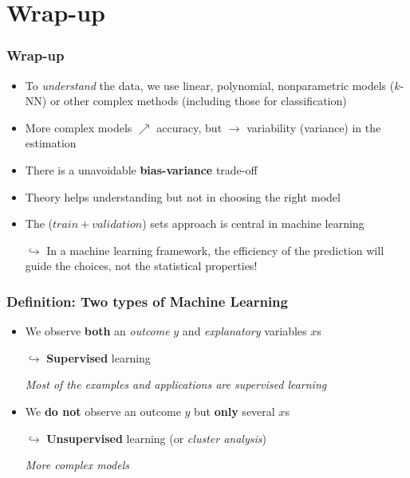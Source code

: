 \documentclass[xcolor=x11names,compress, aspectratio=169]{beamer}
\renewcommand{\(}{\begin{columns}}
\renewcommand{\)}{\end{columns}}
\newcommand{\<}[1]{\begin{column}{#1}}
\renewcommand{\>}{\end{column}}
\begin{document}
\section{Wrap-up}

\begin{frame}
\frametitle{\textcolor{brique}{ Wrap-up }}
\pause
\begin{itemize}[<+->]
\item To \textit{understand }the data, we use linear, polynomial, nonparametric models ($k$-NN) or other complex methods (including those for classification)
\item More complex models $\nearrow$ accuracy, but $\rightarrow$ variability (variance) in the estimation
\item  There is a unavoidable  \textbf{bias-variance} trade-off
\item Theory helps understanding but not in choosing the right model
\item The ($train + validation$) sets approach is central in machine learning%
\item[$\hookrightarrow$] In a machine learning framework, the efficiency of the prediction will guide the choices, not the statistical properties! %
\end{itemize}
\end{frame}


\begin{frame} %
\frametitle{Definition: Two types of Machine Learning}
\pause
\begin{itemize}[<+->]
  \item We observe \textbf{both} an \textit{outcome} $y$ and \textit{explanatory} variables $x$s
   \item[$\hookrightarrow$] \textbf{Supervised} learning
   \item[] \textit{Most of the examples and applications are supervised learning}
   \item We \textbf{do not} observe an outcome $y$ but\textbf{ only} several $x$s
   \item[$\hookrightarrow$] \textbf{Unsupervised} learning (or \textit{cluster analysis})
  \item[] \textit{More complex models }
 \end{itemize}
\end{frame}
\end{document}
